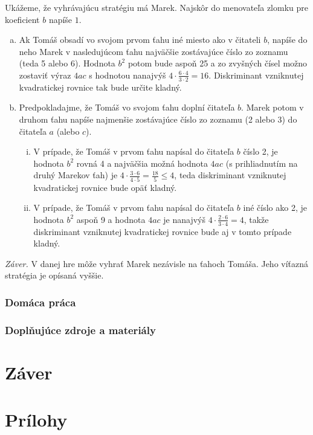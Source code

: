 \documentclass[11pt,a4paper,oneside,final]{book}
\begin{document}
Ukážeme, že vyhrávajúcu stratégiu má Marek. Najskôr do menovateľa zlomku pre koeficient $b$ napíše $1$.
\begin{enumerate}[a)]
\item Ak Tomáš obsadí vo svojom prvom ťahu iné miesto ako v čitateli $b$, napíše do neho Marek v nasledujúcom ťahu najväčšie zostávajúce číslo zo zoznamu (teda 5 alebo 6). Hodnota $b^2$ potom bude aspoň 25 a zo zvyšných čísel možno zostaviť výraz $4ac$ s hodnotou nanajvýš $4\cdot  \frac{6\cdot4}{3\cdot2}= 16$. Diskriminant vzniknutej kvadratickej rovnice tak bude určite kladný.
\item Predpokladajme, že Tomáš vo svojom ťahu doplní čitateľa $b$. Marek potom v druhom ťahu napíše najmenšie zostávajúce číslo zo zoznamu (2 alebo 3) do čitateľa $a$ (alebo $c$).
\begin{enumerate}[(i)]
\item V prípade, že Tomáš v prvom ťahu napísal do čitateľa $b$ číslo 2, je hodnota $b^2$ rovná 4 a najväčšia možná hodnota $4ac$ (s prihliadnutím na druhý Marekov ťah) je $4 \cdot \frac{3\cdot 6}{4\cdot 5}=\frac{18}{5}\leq  4$, teda diskriminant vzniknutej kvadratickej rovnice bude opäť kladný.
\item  V prípade, že Tomáš v prvom ťahu napísal do čitateľa $b$ iné číslo ako 2, je hodnota $b^2$ aspoň 9 a hodnota $4ac$ je nanajvýš $4 \cdot \frac{2\cdot 6}{3\cdot4} = 4$, takže diskriminant
vzniknutej kvadratickej rovnice bude aj v tomto prípade kladný.

\end{enumerate}
\end{enumerate}
\textit{Záver.} V danej hre môže vyhrať Marek nezávisle na ťahoch Tomáša. Jeho víťazná
stratégia je opísaná vyššie.


\subsection*{Domáca práca}

\subsection*{Doplňujúce zdroje a materiály}

\chapter*{Záver}
\label{chap:zaver}

\chapter*{Prílohy}
\label{chap:pril}
\end{document}
